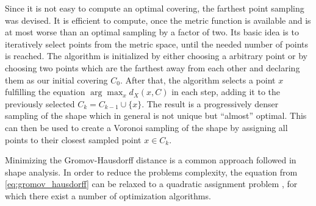 Since it is not easy to compute an optimal covering, the farthest point sampling was devised.
It is efficient to compute, once the metric function is available and is at most worse than an optimal sampling by a factor of two.
Its basic idea is to iteratively select points from the metric space, until the needed number of points is reached.
The algorithm is initialized by either choosing a arbitrary point or by choosing two points which are the farthest away from each other and declaring them as our initial covering $C_0$.
After that, the algorithm selects a point $x$ fulfilling the equation $\arg \! \max_x d_X(x,C)$ in each step, adding it to the previously selected $C_k = C_{k-1} \cup \{x\}$.
The result is a progressively denser sampling of the shape which in general is not unique but ``almost'' optimal.
This can then be used to create a Voronoi sampling of the shape by assigning all points to their closest sampled point $x \in C_k$.

Minimizing the Gromov-Hausdorff distance is a common approach followed in shape analysis.
In order to reduce the problems complexity, the equation from \eqref{eq:gromov_hausdorff} can be relaxed to a quadratic assignment problem \cite{memoli2007use}, for which there exist a number of optimization algorithms.
